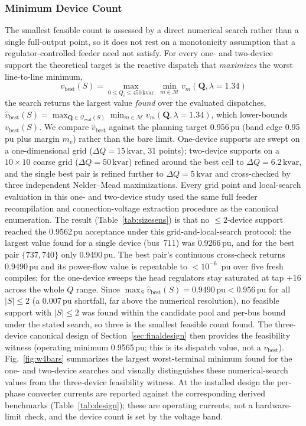 \documentclass{ieeeaccess}
\newcommand{\SI}[2]{#1\,\ensuremath{\mathrm{#2}}}
\newcommand{\kvar}{\text{kvar}}
\begin{document}
\subsubsection{Minimum Device Count}
\label{sec:sensitivity}

The smallest feasible count is assessed by a direct numerical search rather than a
single full-output point, so it does not rest on a monotonicity assumption that a
regulator-controlled feeder need not satisfy. For every one- and two-device support
the theoretical target is the reactive dispatch that \emph{maximizes} the worst
line-to-line minimum,
\begin{equation}
v_{\mathrm{best}}(S) = \max_{0\le Q_i\le\SI{450}{\kvar}}\ \min_{m\in\mathcal M}
v_m(\mathbf Q,\lambda=1.34)
\label{eq:vbest}
\end{equation}
the search returns the largest value \emph{found} over the evaluated dispatches,
$\hat v_{\mathrm{best}}(S)=\max_{\mathbf Q\in\mathcal Q_{\mathrm{eval}}(S)}
\min_{m\in\mathcal M} v_m(\mathbf Q,\lambda=1.34)$, which lower-bounds
$v_{\mathrm{best}}(S)$. We compare $\hat v_{\mathrm{best}}$ against the planning
target \SI{0.956}{pu} (band edge \SI{0.95}{pu} plus margin $m_v$) rather than the
bare limit. One-device supports are swept on a one-dimensional grid
($\Delta Q=\SI{15}{\kvar}$, 31 points); two-device supports on a $10\times10$ coarse
grid ($\Delta Q=\SI{50}{\kvar}$) refined around the best cell to
$\Delta Q=\SI{6.2}{\kvar}$, and the single best pair is refined further to
$\Delta Q=\SI{5}{\kvar}$ and cross-checked by three independent Nelder--Mead
maximizations. Every grid point and local-search evaluation in this one- and
two-device study used the same full feeder recompilation and connection-voltage
extraction procedure as the canonical enumeration. The result (Table~\ref{tab:sizesens}) is that no $\le 2$-device
support reached the \SI{0.9562}{pu} acceptance under this grid-and-local-search
protocol: the largest value found for a single device (bus~711) was
\SI{0.9266}{pu}, and for the best pair $\{737,740\}$ only \SI{0.9490}{pu}. The best
pair's continuous cross-check returns \SI{0.9490}{pu} and its power-flow value is
repeatable to $<10^{-6}$~pu over five fresh compiles; for the one-device sweeps the
head regulators stay saturated at tap $+16$ across the whole $Q$ range. Since
$\max_S \hat v_{\mathrm{best}}(S)=\SI{0.9490}{pu}<\SI{0.956}{pu}$ for all $|S|\le2$
(a \SI{0.007}{pu} shortfall, far above the numerical resolution), no feasible
support with $|S|\le2$ was found within the candidate pool and per-bus bound under
the stated search, so three is the smallest feasible count found. The three-device canonical
design of Section~\ref{sec:finaldesign} then provides the feasibility witness
(operating minimum \SI{0.9565}{pu}; this is its dispatch value, not a
$v_{\mathrm{best}}$). Fig.~\ref{fig:w4bars} summarizes the largest
worst-terminal minimum found for the one- and two-device searches and visually
distinguishes these numerical-search values from the three-device feasibility
witness. At the installed design the per-phase converter currents
are reported against the corresponding derived benchmarks (Table~\ref{tab:design});
these are operating currents, not a hardware-limit check, and the device count is set
by the voltage band.
\end{document}

